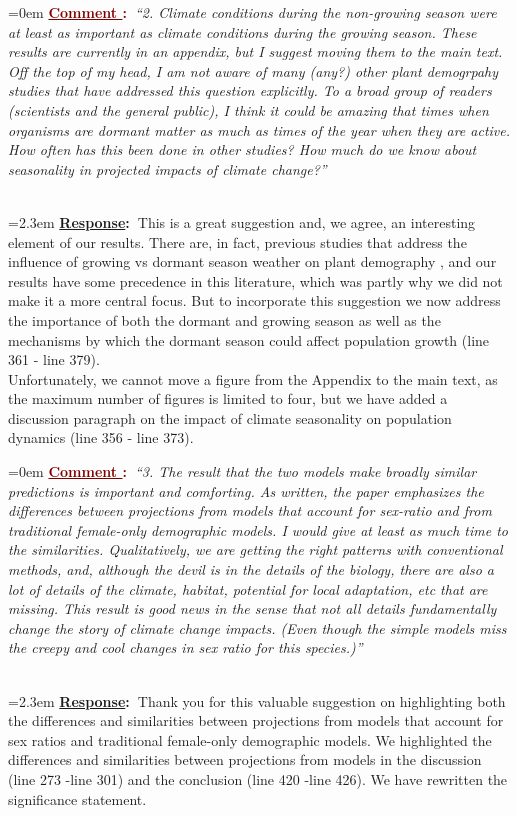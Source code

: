 \documentclass[12pt]{article}
\newcounter{cN}
\newcommand{\comment}[1]{
	\vspace{2em}
	\refstepcounter{cN} %
	\noindent \hangindent=0em \textbf{\textcolor{Maroon}{\uline{Comment \thecN}:~}}\emph{``#1''}
	}
\newcommand{\response}[1]{
	\\[0.25em]
	\hangindent=2.3em \textbf{\textcolor{NavyBlue}{\uline{Response}:~}}#1
	}
\begin{document}
\comment{2. Climate conditions during the non-growing season were at least as important as climate conditions during the growing season. These results are currently in an appendix, but I suggest moving them to the main text. Off the top of my head, I am not aware of many (any?) other plant demogrpahy studies that have addressed this question explicitly. To a broad group of readers (scientists and the general public), I think it could be amazing that times when organisms are dormant matter as much as times of the year when they are active. How often has this been done in other studies? How much do we know about seasonality in projected impacts of climate change?}
\response{This is a great suggestion and, we agree, an interesting element of our results. There are, in fact, previous studies that address the influence of growing vs dormant season weather on plant demography  \citep[e.g.,][] {evers2021lagged}, and our results have some precedence in this literature, which was partly why we did not make it a more central focus. 
But to incorporate this suggestion we now address the importance of both the dormant and growing season as well as the mechanisms by which the dormant season could affect population growth (line 361 - line 379). 
\\
Unfortunately, we cannot move a figure from the Appendix to the main text, as the maximum number of figures is limited to four, but we have added a discussion paragraph on the impact of climate seasonality on population dynamics (line 356 - line 373).}

\comment{3. The result that the two models make broadly similar predictions is important and comforting. As written, the paper emphasizes the differences between projections from models that account for sex-ratio and from traditional female-only demographic models. I would give at least as much time to the similarities. Qualitatively, we are getting the right patterns with conventional methods, and, although the devil is in the details of the biology, there are also a lot of details of the climate, habitat, potential for local adaptation, etc that are missing. This result is good news in the sense that not all details fundamentally change the story of climate change impacts. (Even though the simple models miss the creepy and cool changes in sex ratio for this species.)}
\response{Thank you for this valuable suggestion on highlighting both the differences and similarities between projections from models that account for sex ratios and traditional female-only demographic models. 
We highlighted the differences and similarities between projections from models in the discussion (line 273 -line 301) and the conclusion  (line 420 -line 426). We have rewritten the significance statement.}
\end{document}
